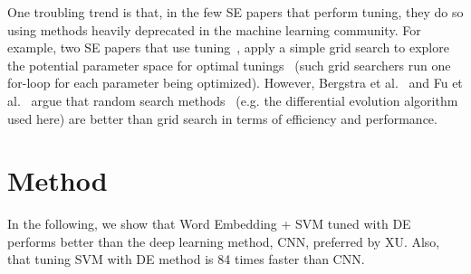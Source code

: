 \documentclass[sigconf]{acmart}
\theoremstyle{break}
\newcommand{\bi}{\begin{itemize}[leftmargin=0.4cm]}
\newcommand{\ei}{\end{itemize}}
\begin{document}
One troubling trend is that, in the few SE papers that perform tuning,
they do so using methods heavily deprecated in the machine learning community.
For example, two SE papers that use tuning~\cite{lessmann2008benchmarking,tantithamthavorn2016automated}, 
apply a simple grid search to explore the potential parameter space for optimal tunings
~(such grid searchers run one for-loop for each parameter being optimized). 
However, Bergstra et al.~\cite{bergstra2012random} and 
Fu et al.~\cite{fu2016differential} argue that random search methods
~(e.g. the 
differential evolution algorithm used here) are better than 
grid search in terms of efficiency and performance.





\section{Method}\label{method}
In the following, 
we show that Word Embedding + SVM tuned with DE performs better than the deep learning method, CNN, preferred by XU.
Also, that tuning SVM with DE method is 84 times faster than CNN. 
\end{document}
